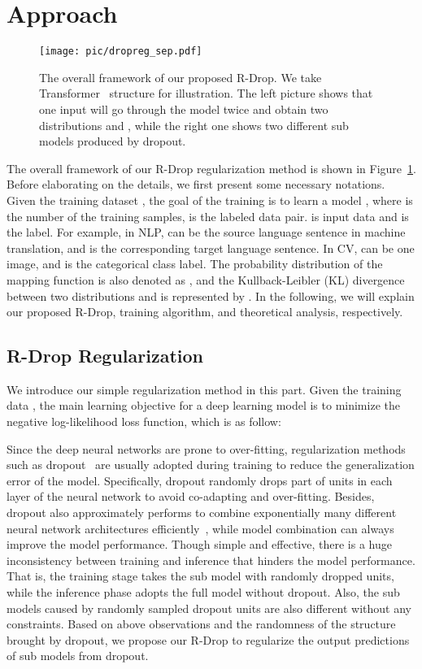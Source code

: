 \documentclass{article}
\begin{document}
\section{Approach}
\label{sec:approach}

\begin{figure}
    \centering
    \texttt{[image: pic/dropreg\_sep.pdf]}
    \caption{The overall framework of our proposed R-Drop. We take Transformer~\cite{vaswani2017attention} structure for illustration. The left picture shows that one input  will go through the model twice and obtain two distributions  and , while the right one shows two different sub models produced by dropout.}
    \label{fig:R-Drop}
\end{figure}

The overall framework of our R-Drop regularization method is shown in Figure~\ref{fig:R-Drop}. 
Before elaborating on the details, we first present some necessary notations. 
Given the training dataset , the goal of the training is to learn a model , where  is the number of the training samples,  is the labeled data pair.  is input data and  is the label. For example, in NLP,  can be the source language sentence in machine translation, and  is the corresponding target language sentence. In CV,  can be one image, and  is the categorical class label. 
The probability distribution of the mapping function is also denoted as , and the Kullback-Leibler (KL) divergence between two distributions  and  is represented by . 
In the following, we will explain our proposed R-Drop, training algorithm, and theoretical analysis, respectively.

\subsection{R-Drop Regularization}
We introduce our simple regularization method in this part. Given the training data , the main learning objective for a deep learning model is to minimize the negative log-likelihood loss function, which is as follow:


Since the deep neural networks are prone to over-fitting, regularization methods such as dropout~\cite{srivastava2014dropout} are usually adopted during training to reduce the generalization error of the model. 
Specifically, dropout randomly drops part of units in each layer of the neural network to avoid co-adapting and over-fitting. 
Besides, dropout also approximately performs to combine exponentially many different neural network architectures efficiently~\cite{srivastava2014dropout}, while model combination can always improve the model performance. 
Though simple and effective, there is a huge inconsistency between training and inference that hinders the model performance. That is, the training stage takes the sub model with randomly dropped units, while the inference phase adopts the full model without dropout. Also, the sub models caused by randomly sampled dropout units are also different without any constraints. 
Based on above observations and the randomness of the structure brought by dropout, we propose our R-Drop to regularize the output predictions of sub models from dropout.
\end{document}
